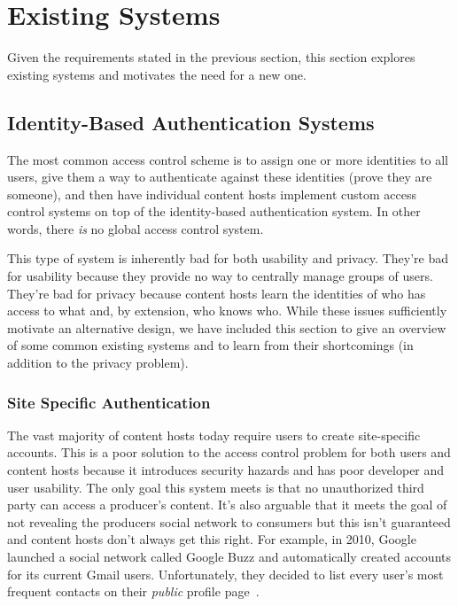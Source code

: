\documentclass[pdftex,12pt,a4papaer,twoside,notitlepage]{report}
\begin{document}
\section{Existing Systems} 

Given the requirements stated in the previous section, this section explores existing
systems and motivates the need for a new one.

\subsection{Identity-Based Authentication Systems}
\label{sec:identity-auth}

The most common access control scheme is to assign one or more identities to all
users, give them a way to authenticate against these identities (prove they are
someone), and then have individual content hosts implement custom access control
systems on top of the identity-based authentication system. In other words,
there \emph{is} no global access control system.

This type of system is inherently bad for both usability and privacy. They're
bad for usability because they provide no way to centrally manage groups of
users. They're bad for privacy because content hosts learn the identities of who
has access to what and, by extension, who knows who. While these issues
sufficiently motivate an alternative design, we have included this section to
give an overview of some common existing systems and to learn from their
shortcomings (in addition to the privacy problem).

\subsubsection{Site Specific Authentication}

The vast majority of content hosts today require users to create site-specific
accounts. This is a poor solution to the access control problem for both users
and content hosts because it introduces security hazards and has poor developer
and user usability. The only goal this system meets is that no unauthorized
third party can access a producer's content. It's also arguable that it meets
the goal of not revealing the producers social network to consumers but this
isn't guaranteed and content hosts don't always get this right. For example, in
2010, Google launched a social network called Google Buzz and automatically
created accounts for its current Gmail users. Unfortunately, they decided to
list every user's most frequent contacts on their \emph{public} profile
page~\cite{google-buzz}.
\end{document}
